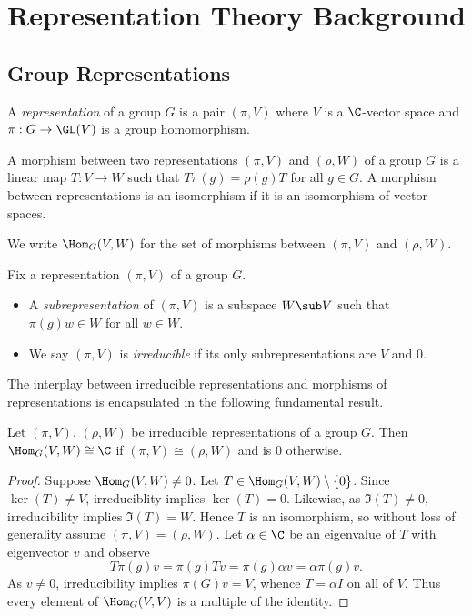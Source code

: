 \documentclass[../main.tex]{subfiles}
\begin{document}
\section{Representation Theory Background}

\subsection{Group Representations}

\begin{definition}
    A \textit{representation} of a group $ G $ is a pair $ (\pi, V) $ where $ V $ is a $ \C $-vector space and $ \pi: G\to \GL(V) $ is a group homomorphism.
\end{definition}

\begin{definition}
    A morphism between two representations $ (\pi, V) $ and $ (\rho, W) $ of a group $ G $ is a linear map $ T:V\to W $ such that $ T \pi(g) = \rho(g) T $ for all $ g\in G $. A morphism between representations is an isomorphism if it is an isomorphism of vector spaces.

    We write $ \Hom_{G}(V,W) $ for the set of morphisms between $ (\pi,V) $ and $ (\rho,W) $.
\end{definition}

\begin{definition} Fix a representation $ (\pi,V) $ of a group $ G $.
    \begin{itemize}
        \item  A \textit{subrepresentation} of $ (\pi,V) $ is a subspace $ W\sub V $ such that $ \pi(g)w\in W $ for all $ w\in W $.
        \item We say $ (\pi,V) $ is \textit{irreducible} if its only subrepresentations are $ V $ and $ 0 $.
    \end{itemize}
\end{definition}

The interplay between irreducible representations and morphisms of representations is encapsulated in the following fundamental result.

\begin{lemma}
    Let $ (\pi,V) $, $ (\rho,W) $ be irreducible representations of a group $ G $. Then $ \Hom_{G}(V,W)\cong\C $ if $ (\pi,V)\cong (\rho,W) $ and is $ 0 $ otherwise.
\end{lemma}

\begin{proof}
    Suppose $ \Hom_{G}(V,W)\neq 0 $. Let $ T\in \Hom_{G}(V,W)\setminus\{0\} $. Since $ \ker(T)\neq V $, irreduciblity implies $ \ker(T) = 0 $. Likewise, as $ \Im(T) \neq 0 $, irreducibility implies $ \Im(T) = W $. Hence $ T $ is an isomorphism, so without loss of generality assume $ (\pi,V) = (\rho,W) $. Let $ \alpha\in \C $ be an eigenvalue of $ T $ with eigenvector $ v $ and observe
    \[
        T \pi(g) v = \pi(g) T v = \pi(g) \alpha v = \alpha\pi(g) v.
    \]
    As $ v\neq 0 $, irreducibility implies $ \pi(G)v = V$, whence $ T = \alpha I $ on all of $ V $. Thus every element of $ \Hom_{G}(V,V) $ is a multiple of the identity.
\end{proof}
\end{document}
